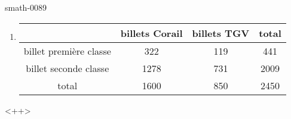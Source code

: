 
\begin{corrige}{smath-0089}

    \begin{enumerate}
        \item
            
\begin{center}
        \begin{tabular}[]{|c||c|c|c|}
            \hline
            &billets Corail&billets TGV& total\\
            \hline\hline
            billet première classe&322&119&441\\
            \hline
            billet seconde classe&1278&731&2009\\
            \hline
            total&1600&850&2450\\
            \hline
        \end{tabular}
\end{center}
    \end{enumerate}
    <++>

\end{corrige}
